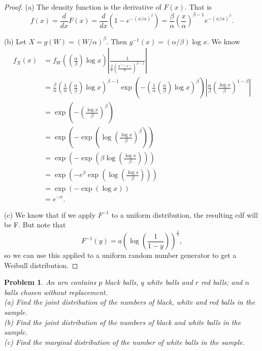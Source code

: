 \documentclass{article}
\newtheorem{problem}{Problem}
\begin{document}
\begin{proof}
(a) The density function is the derivative of $F(x)$. That is
\[
f(x) = \frac{d}{dx} F(x) = \frac{d}{dx} \left (1 - e^{-(x/\alpha)^{\beta}} \right ) = \frac{\beta}{\alpha} \left ( \frac{x}{\alpha} \right )^{\beta - 1} e^{- (x/\alpha)^{\beta}}.
\]

(b) Let $X = g(W) = (W/\alpha)^{\beta}$. Then $g^{-1}(x) = (\alpha/\beta) \log x$. We know
\begin{align*}
f_X(x)
&= f_W \left ( \left (\frac{\alpha}{\beta} \right ) \log x \right ) \left | \frac{1}{\frac{\beta}{\alpha} \left (\frac{g^{-1}(x)}{\alpha} \right )^{\beta - 1}} \right |\\
&= \frac{\beta}{\alpha} \left ( \frac{1}{\alpha} \left ( \frac{\alpha}{\beta} \right ) \log x \right )^{\beta - 1} \exp \left (- \left ( \frac{1}{\alpha} \left ( \frac{\alpha}{\beta} \right ) \log x \right )^{\beta} \right ) \left | \frac{\alpha}{\beta} \left (\frac{\log x}{\beta} \right )^{1 - \beta} \right |\\
&= \exp \left ( -\left ( \frac{\log x}{\beta} \right )^{\beta} \right )\\
&= \exp \left (-\exp \left ( \log \left (\frac{\log x}{\beta} \right )^{\beta} \right ) \right )\\
&= \exp \left (-\exp \left ( \beta \log \left (\frac{\log x}{\beta} \right ) \right ) \right )\\
&= \exp \left (-e^{\beta} \exp \left ( \log \left (\frac{\log x}{\beta} \right ) \right ) \right )\\
&= \exp ( - \exp ( \log x))\\
&= e^{-x}.
\end{align*}

(c) We know that if we apply $F^{-1}$ to a uniform distribution, the resulting cdf will be F. But note that
\[
F^{-1}(y) = a \left ( \log \left (\frac{1}{1-y} \right ) \right )^{\frac{1}{b}},
\]
so we can use this applied to a uniform random number generator to get a Weibull distribution.
\end{proof}

\begin{problem}
An urn contains $p$ black balls, $q$ white balls and $r$ red balls; and $n$ balls chosen without replacement.\\
(a) Find the joint distribution of the numbers of black, white and red balls in the sample.\\
(b) Find the joint distribution of the numbers of black and white balls in the sample.\\
(c) Find the marginal distribution of the number of white balls in the sample.
\end{problem}
\end{document}
